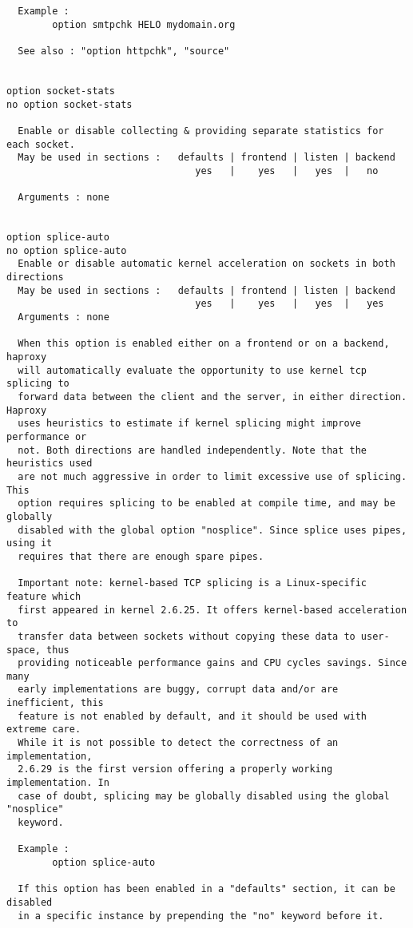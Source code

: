 \begin{verbatim}
  Example :
        option smtpchk HELO mydomain.org

  See also : "option httpchk", "source"


option socket-stats
no option socket-stats

  Enable or disable collecting & providing separate statistics for each socket.
  May be used in sections :   defaults | frontend | listen | backend
                                 yes   |    yes   |   yes  |   no

  Arguments : none


option splice-auto
no option splice-auto
  Enable or disable automatic kernel acceleration on sockets in both directions
  May be used in sections :   defaults | frontend | listen | backend
                                 yes   |    yes   |   yes  |   yes
  Arguments : none

  When this option is enabled either on a frontend or on a backend, haproxy
  will automatically evaluate the opportunity to use kernel tcp splicing to
  forward data between the client and the server, in either direction. Haproxy
  uses heuristics to estimate if kernel splicing might improve performance or
  not. Both directions are handled independently. Note that the heuristics used
  are not much aggressive in order to limit excessive use of splicing. This
  option requires splicing to be enabled at compile time, and may be globally
  disabled with the global option "nosplice". Since splice uses pipes, using it
  requires that there are enough spare pipes.

  Important note: kernel-based TCP splicing is a Linux-specific feature which
  first appeared in kernel 2.6.25. It offers kernel-based acceleration to
  transfer data between sockets without copying these data to user-space, thus
  providing noticeable performance gains and CPU cycles savings. Since many
  early implementations are buggy, corrupt data and/or are inefficient, this
  feature is not enabled by default, and it should be used with extreme care.
  While it is not possible to detect the correctness of an implementation,
  2.6.29 is the first version offering a properly working implementation. In
  case of doubt, splicing may be globally disabled using the global "nosplice"
  keyword.

  Example :
        option splice-auto

  If this option has been enabled in a "defaults" section, it can be disabled
  in a specific instance by prepending the "no" keyword before it.


\end{verbatim}
